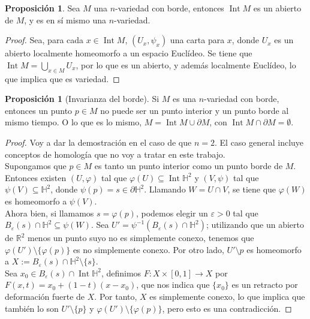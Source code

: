 \documentclass[10pt]{report}
\newcommand{\R}{\mathbb{R}}
\DeclareMathOperator{\interior}{Int} %
\theoremstyle{definition}
\newtheorem{prop}[defin]{Proposición}
\begin{document}
\begin{prop}\label{prop:int_variedad}%
Sea $M$ una $n$-variedad con borde, entonces $\interior{M}$ es un abierto de $M$, y es en sí mismo una $n$-variedad.
\end{prop}
\begin{proof}
Sea, para cada $x\in \interior{M}$, $(U_x,\psi_x)$ una carta para $x$, donde $U_x$ es un abierto localmente homeomorfo a un espacio Euclídeo. Se tiene que $\interior{M}=\bigcup_{x\in M} U_x$, por lo que es un abierto, y además localmente Euclídeo, lo que implica que es variedad.
\end{proof}
\begin{prop}[Invarianza del borde]%
Si $M$ es una $n$-variedad con borde, entonces un punto $p\in M$ no puede ser un punto interior y un punto borde al mismo tiempo. O lo que es lo mismo, $M=\interior{M} \cup \partial M$, con $\interior{M} \cap \partial M=\emptyset$.
\end{prop}
\begin{proof}
Voy a dar la demostración en el caso de que $n=2$. El caso general incluye conceptos de homología que no voy a tratar en este trabajo.\\
Supongamos que $p\in M$ es tanto un punto interior como un punto borde de $M$. Entonces existen $(U,\varphi)$ tal que $\varphi (U)\subseteq \interior{\mathbb{H}^2}$ y $(V,\psi)$ tal que $\psi (V)\subseteq \mathbb{H}^2$, donde $\psi (p)=s\in \partial \mathbb{H}^2$. Llamando $W=U\cap V$, se tiene que $\varphi (W)$ es homeomorfo a $\psi (V)$. \\
Ahora bien, si llamamos $s=\varphi (p)$, podemos elegir un $\varepsilon >0$ tal que $B_{\varepsilon}(s)\cap \mathbb{H}^2 \subseteq \psi (W)$. Sea $U'=\psi^{-1}\left( B_{\varepsilon}(s) \cap \mathbb{H}^2\right)$; utilizando que un abierto de $\R^2$ menos un punto suyo no es simplemente conexo, tenemos que $\varphi (U')\setminus \{\varphi (p) \}$ es no simplemente conexo. Por otro lado, $U'\setminus {p}$ es homeomorfo a $X:=B_{\varepsilon}(s)\cap \mathbb{H}^2 \setminus \{ s\}$.\\
Sea $x_0\in B_{\varepsilon}(s)\cap \interior{\mathbb{H}^2}$, definimos $F: X\times \left[ 0,1\right] \to X$ por $F(x,t)=x_0 + (1-t)(x-x_0)$, que nos indica que $\{x_0\}$ es un retracto por deformación fuerte de $X$. Por tanto, $X$ es simplemente conexo, lo que implica que también lo son $U'\setminus \{p\}$ y $\varphi(U')\setminus \{ \varphi (p)\}$, pero esto es una contradicción.
\end{proof}
\end{document}

